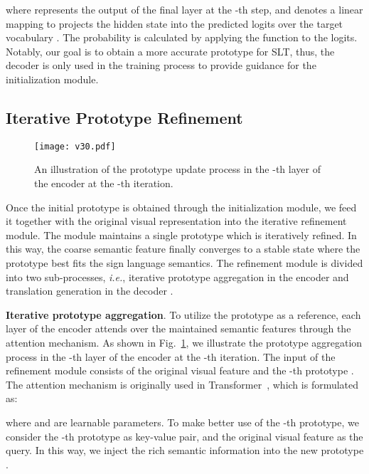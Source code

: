 \documentclass[10pt,twocolumn,letterpaper]{article}
\begin{document}
    where  represents the output of the final layer at the -th step, and  denotes a linear mapping to projects the hidden state  into the predicted logits over the target vocabulary . The probability is calculated by applying the  function to the logits.
    Notably, our goal is to obtain a more accurate prototype for SLT, thus, the decoder  is only used in the training process to provide guidance for the initialization module.

    \subsection{Iterative Prototype Refinement}
    
    \begin{figure}
    \centering
    \texttt{[image: v30.pdf]}
    \caption{An illustration of the prototype update process in the -th layer of the encoder  at the -th iteration.
    }
    \label{fig3}
    \end{figure}
    
    Once the initial prototype  is obtained through the initialization module, we feed it together with the original visual representation  into the iterative refinement module. The module maintains a single prototype which is iteratively refined. In this way, the coarse semantic feature finally converges to a stable state where the prototype best fits the sign language semantics. The refinement module is divided into two sub-processes, \emph{i.e.}, iterative prototype aggregation in the encoder  and translation generation in the decoder .

    \smallskip
    \noindent \textbf{Iterative prototype aggregation}.
    To utilize the prototype as a reference, each layer of the encoder  attends over the maintained semantic features through the attention mechanism. 
    As shown in Fig.~\ref{fig3}, we illustrate the prototype aggregation process in the -th layer of the encoder  at the -th iteration. 
    The input of the refinement module consists of the original visual feature  and the -th prototype . The attention mechanism  is originally used in Transformer~\cite{vaswani2017attention}, which is formulated as:\vspace{-1mm}
    
    where  and  are learnable parameters. To make better use of the -th prototype, we consider the -th prototype  as key-value pair, and the original visual feature  as the query. In this way, we inject the rich semantic information into the new prototype .
    
\end{document}
